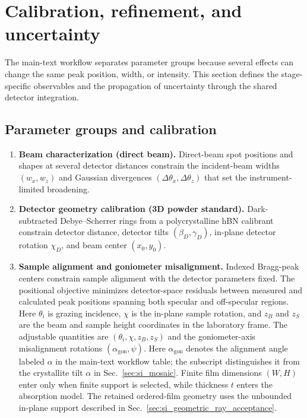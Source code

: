 \section{Calibration, refinement, and uncertainty}
\label{sec:si_workflow}

The main-text workflow separates parameter groups because several effects can change the same peak position, width, or intensity. This section defines the stage-specific observables and the propagation of uncertainty through the shared detector integration.

\subsection{Parameter groups and calibration}

\begin{enumerate}
  \item \textbf{Beam characterization (direct beam).}
  Direct-beam spot positions and shapes at several detector distances constrain the incident-beam widths $(w_x,w_z)$ and Gaussian divergences $(\Delta\theta_x,\Delta\theta_z)$ that set the instrument-limited broadening.

  \item \textbf{Detector geometry calibration (3D powder standard).}
  Dark-subtracted Debye--Scherrer rings from a polycrystalline hBN calibrant constrain detector distance, detector tilts $(\beta_D,\gamma_D)$, in-plane detector rotation $\chi_D$, and beam center $(x_0,y_0)$.

  \item \textbf{Sample alignment and goniometer misalignment.}
  Indexed Bragg-peak centers constrain sample alignment with the detector parameters fixed. The positional objective minimizes detector-space residuals between measured and calculated peak positions spanning both specular and off-specular regions. Here $\theta_i$ is grazing incidence, $\chi$ is the in-plane sample rotation, and $z_B$ and $z_S$ are the beam and sample height coordinates in the laboratory frame. The adjustable quantities are $(\theta_i,\chi,z_B,z_S)$ and the goniometer-axis misalignment rotations $(\alpha_{\mathrm{gon}},\psi)$. Here $\alpha_{\mathrm{gon}}$ denotes the alignment angle labeled $\alpha$ in the main-text workflow table; the subscript distinguishes it from the crystallite tilt $\alpha$ in Sec.~\ref{sec:si_mosaic}. Finite film dimensions $(W,H)$ enter only when finite support is selected, while thickness $t$ enters the absorption model. The retained ordered-film geometry uses the unbounded in-plane support described in Sec.~\ref{sec:si_geometric_ray_acceptance}.


\end{enumerate}

